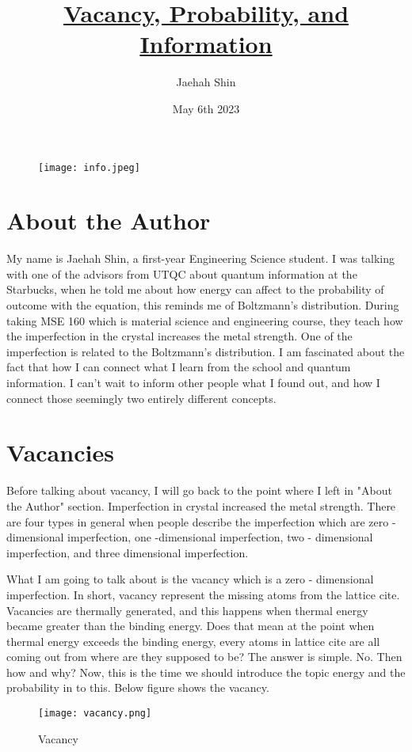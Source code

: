 \documentclass{article}
\title{\underline {\textbf{Vacancy, Probability, and Information}}}
\author{Jaehah Shin}
\date{May 6th 2023}
\begin{document}
\maketitle
\begin{figure}[h]
    \centering
    \texttt{[image: info.jpeg]}
    \label{fig:z}
\end{figure}

\section{About the Author}
My name is Jaehah Shin, a first-year Engineering Science student. I was talking with one of the advisors from UTQC about quantum information at the Starbucks, when he told me about how energy can affect to the probability of outcome with the equation, this reminds me of Boltzmann's distribution. 
During taking MSE 160 which is material science and engineering course, they teach how the imperfection in the crystal increases the metal strength. One of the imperfection is related to the Boltzmann's distribution. I am fascinated about the fact that how I can connect what I learn from the school and quantum information. I can't wait to inform other people what I found out, and how I connect those seemingly two entirely different concepts. 
\section{Vacancies}
Before talking about vacancy, I will go back to the point where I left in "About the Author" section. Imperfection in crystal increased the metal strength. There are four types in general when people describe the imperfection which are zero - dimensional imperfection, one -dimensional imperfection, two - dimensional imperfection, and three dimensional imperfection. 

What I am going to talk about is the vacancy which is a zero - dimensional imperfection. In short, vacancy represent the missing atoms from the lattice cite. Vacancies are thermally generated, and this happens when thermal energy became greater than the binding energy. Does that mean at the point when thermal energy exceeds the binding energy, every atoms in lattice cite are all coming out from where are they supposed to be? The answer is simple. No. Then how and why? Now, this is the time we should introduce the topic energy and the probability in to this.
Below figure shows the vacancy.
\begin{figure}[h]
    \centering
    \texttt{[image: vacancy.png]}
    \caption{Vacancy}
    \label{fig:Vacancy}
\end{figure}
\end{document}
